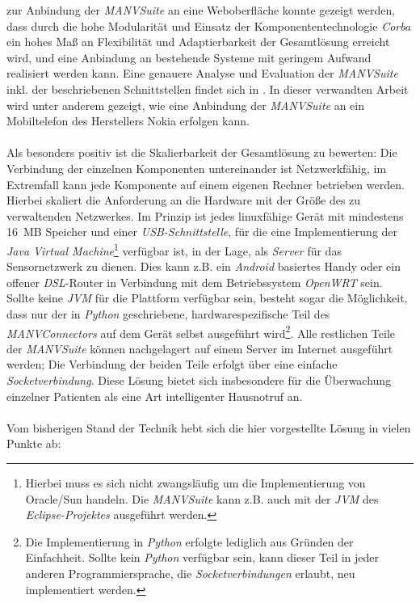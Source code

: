 zur Anbindung der \emph{MANVSuite} an eine Weboberfläche konnte gezeigt werden, dass durch die hohe Modularität
und Einsatz der Komponententechnologie \emph{Corba} ein hohes Maß an Flexibilität und Adaptierbarkeit der
Gesamtlösung erreicht wird, und eine Anbindung an bestehende Systeme mit geringem Aufwand realisiert werden kann.
Eine genauere Analyse und Evaluation der \emph{MANVSuite} inkl. der beschriebenen Schnittstellen findet sich
in \cite{Jan}. In dieser verwandten Arbeit wird unter anderem gezeigt, wie eine Anbindung der \emph{MANVSuite}
an ein Mobiltelefon des Herstellers Nokia erfolgen kann.\\
\\
Als besonders positiv ist die Skalierbarkeit der Gesamtlösung zu bewerten: Die Verbindung der einzelnen Komponenten 
untereinander ist Netzwerkfähig, im Extremfall kann jede
Komponente auf einem eigenen Rechner betrieben werden. Hierbei skaliert die Anforderung an die Hardware mit
der Größe des zu verwaltenden Netzwerkes. Im Prinzip ist jedes linuxfähige Gerät mit mindestens 16~MB Speicher
und einer \emph{USB-Schnittstelle}, für die eine Implementierung der \emph{Java Virtual Machine}\footnote{Hierbei muss
es sich nicht zwangsläufig um die Implementierung von Oracle/Sun handeln. Die \emph{MANVSuite} kann z.B. auch
mit der \emph{JVM} des \emph{Eclipse-Projektes} ausgeführt werden.} verfügbar ist, in der Lage, als \emph{Server}
für das Sensornetzwerk zu dienen. Dies kann z.B. ein \emph{Android} basiertes Handy oder ein offener
\emph{DSL}-Router in Verbindung mit dem Betriebssystem \emph{OpenWRT} sein. Sollte keine \emph{JVM} für die
Plattform verfügbar sein, besteht sogar die Möglichkeit, dass nur der in \emph{Python} geschriebene,
hardwarespezifische Teil des \emph{MANVConnectors} auf dem Gerät selbst ausgeführt wird\footnote{Die Implementierung
in \emph{Python} erfolgte lediglich aus Gründen der Einfachheit. Sollte kein \emph{Python} verfügbar sein,
kann dieser Teil in jeder anderen Programmiersprache, die \emph{Socketverbindungen} erlaubt, neu implementiert werden.}. 
Alle restlichen Teile der \emph{MANVSuite} können nachgelagert auf einem Server im Internet ausgeführt werden; 
Die Verbindung der beiden Teile erfolgt über eine einfache \emph{Socketverbindung}. Diese Lösung bietet sich insbesondere 
für die Überwachung einzelner Patienten als eine Art intelligenter Hausnotruf an.\\
\\
Vom bisherigen Stand der Technik hebt sich die hier vorgestellte Lösung in vielen Punkte ab:

